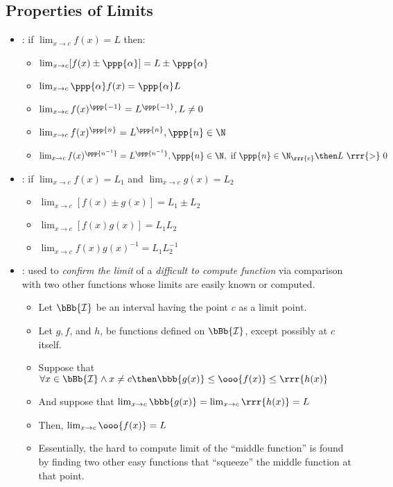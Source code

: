 \begin{itemize}
  \subsection{Properties of Limits}
  \begin{itemize}
    \item {}: if \(\lim_{x \to c}f(x)=L\) then:
    \vspace{-6pt}
      \begin{itemize}
        \item \(\lim_{x \to c}[f(x)\pm \ppp{\alpha}] = L \pm \ppp{\alpha}\)  
        \item \(\lim_{x \to c}\ppp{\alpha} f(x)= \ppp{\alpha} L\)
        \item \(\lim_{x \to c}f(x)^{\ppp{-1}}=L^{\ppp{-1}}, L\neq 0\)
        \item \(\lim_{x \to c}f(x)^\ppp{n} = L^\ppp{n}, \ppp{n} \in \N\)
        \item \(\lim_{x \to c}f(x)^{\ppp{n ^{-1}}} = L^{\ppp{n ^{-1}}}, \ppp{n} \in \N,~\text{if}~\ppp{n} \in \N_\rrr{e} \then L ~\rrr{>}~0\) 
      \end{itemize}
    \medskip
    \item {}: if \(\lim_{x \to c}f(x)= L_1\) and \(\lim_{x \to c}g(x)=L_2\) 
    \vspace{-6pt}
      \begin{itemize}
        \item \(\lim_{x \to c}[f(x)\pm g(x)]=L_1\pm L_2\)
        \item \(\lim_{x \to c}[f(x)g(x)] = L_1 L_2\)
        \item \(\lim_{x \to c}f(x)g(x)^{-1} = L_1L_2^{-1}\)
      \end{itemize}
    \medskip
    \item {}: used to \emph{confirm the limit} of a \emph{difficult to compute function} via comparison with two other functions whose limits are easily known or computed.
      \begin{itemize}
        \item Let \(\bBb{\mathcal{I}}\) be an interval having the point \(c\) as a limit point. 
        \item Let \(g,f\), and \(h\), be functions defined on \(\bBb{\mathcal{I}}\), except possibly at \(c\) itself. 
        \item Suppose that \(\forall x \in \bBb{\mathcal{I}}\land x \neq c \then \bbb{g(x)}\leq \ooo{f(x)} \leq \rrr{h(x)}\)
        \item And suppose that \(\lim_{x \to c}\bbb{g(x)}=\lim_{x \to c}\rrr{h(x)} = L\)
        \item Then, \(\lim_{x \to c}\ooo{f(x)} = L\)
        \item Essentially, the hard to compute limit of the ``middle function'' is found by finding two other easy functions that ``squeeze'' the middle function at that point.
      \end{itemize}
  \end{itemize}


\end{itemize}
